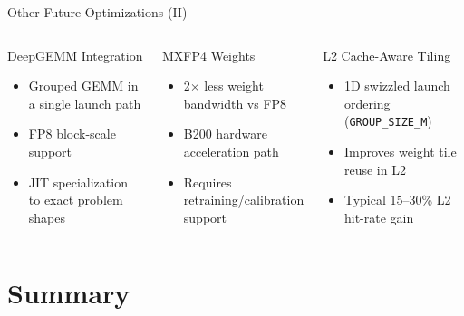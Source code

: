 \documentclass[aspectratio=169,11pt]{beamer}
\begin{document}
\begin{frame}[t]{Other Future Optimizations (II)}
\small
\begin{columns}[T]
\begin{block}{DeepGEMM Integration}
\begin{itemize}
    \item Grouped GEMM in a single launch path
    \item FP8 block-scale support
    \item JIT specialization to exact problem shapes
\end{itemize}
\end{block}

\begin{block}{MXFP4 Weights}
\begin{itemize}
    \item 2$\times$ less weight bandwidth vs FP8
    \item B200 hardware acceleration path
    \item Requires retraining/calibration support
\end{itemize}
\end{block}

\begin{block}{L2 Cache-Aware Tiling}
\begin{itemize}
    \item 1D swizzled launch ordering (\texttt{GROUP\_SIZE\_M})
    \item Improves weight tile reuse in L2
    \item Typical 15--30\% L2 hit-rate gain
\end{itemize}
\end{block}
\end{columns}
\end{frame}

\section{Summary}
\end{document}
